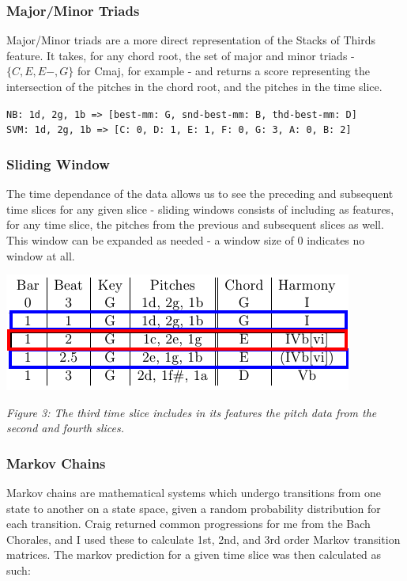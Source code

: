 \documentclass[12pt]{article}
\begin{document}
\subsubsection{Major/Minor Triads}
Major/Minor triads are a more direct representation of the Stacks of Thirds feature. It takes, for any chord root, the set of major and minor triads - $\{C,E,E-,G\}$ for Cmaj, for example - and returns a score representing the intersection of the pitches in the chord root, and the pitches in the time slice. 

\texttt{NB: 1d, 2g, 1b => [best-mm: G, snd-best-mm: B, thd-best-mm: D]}\\
\texttt{SVM: 1d, 2g, 1b => [C: 0, D: 1, E: 1, F: 0, G: 3,  A: 0, B: 2]}
\subsubsection{Sliding Window}
The time dependance of the data allows us to see the preceding and subsequent time slices for any given slice - sliding windows consists of including as features, for any time slice, the pitches from the previous and subsequent slices as well. This window can be expanded as needed - a window size of 0 indicates no window at all.
\begin{center}
\includegraphics[trim = 0.5cm 0 0 0, scale=0.65]{slice.png}
\end{center}
\begin{center}\emph{Figure 3: The third time slice includes in its features the pitch data from the second and fourth slices.}\\ \end{center}

\subsubsection{Markov Chains}
Markov chains are mathematical systems which undergo transitions from one state to another on a state space, given a random probability distribution for each transition. Craig returned common progressions for me from the Bach Chorales, and I used these to calculate 1st, 2nd, and 3rd order Markov transition matrices. The markov prediction for a given time slice was then calculated as such:\\
\end{document}
